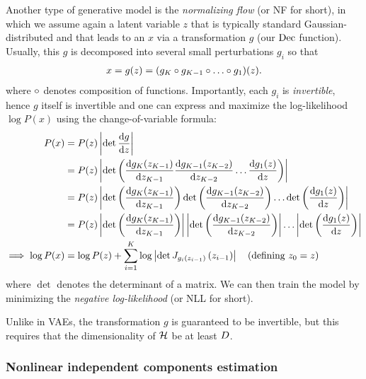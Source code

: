 \documentclass[../main.tex]{subfiles}
\begin{document}
Another type of generative model is the \emph{normalizing flow} (or NF for short), in which we assume again a latent variable $z$ that is typically standard Gaussian-distributed and that leads to an $x$ via a transformation $g$ (our $\operatorname{Dec}$ function).
Usually, this $g$ is decomposed into several small perturbations $g_i$ so that
\begin{align*}
x = g(z) = (g_K \circ g_{K-1} \circ \ldots \circ g_1) (z).
\end{align*}
where $\circ$ denotes composition of functions.
Importantly, each $g_i$ is \emph{invertible}, hence $g$ itself is invertible and one can express and maximize the log-likelihood $\log P(x)$ using the change-of-variable formula:
%
\begin{align*}
    P(x)               & = P(z) \left\lvert \det \frac{\mathrm{d} g}{\mathrm{d} z} \right\rvert       \\
                       & = P(z) \left\lvert \det \left(
        \frac{\mathrm{d} g_K(z_{K-1})}{\mathrm{d} z_{K-1}}
        \frac{\mathrm{d} g_{K-1}(z_{K-2})}{\mathrm{d} z_{K-2}}
        \ldots
        \frac{\mathrm{d} g_1(z)}{\mathrm{d} z}
    \right)\right\rvert                                                   \\
                       & = P(z) \left\lvert
        \det \left(
        \frac{\mathrm{d} g_K(z_{K-1})}{\mathrm{d} z_{K-1}}
        \right)
        \det \left(
        \frac{\mathrm{d} g_{K-1}(z_{K-2})}{\mathrm{d} z_{K-2}}
        \right)
        \ldots
        \det \left(
        \frac{\mathrm{d} g_1(z)}{\mathrm{d} z}
        \right)
    \right\rvert                                                          \\
                       & = P(z) \left\lvert
        \det \left(
        \frac{\mathrm{d} g_K(z_{K-1})}{\mathrm{d} z_{K-1}}
        \right)
    \right\rvert
    \left\lvert
        \det \left(
        \frac{\mathrm{d} g_{K-1}(z_{K-2})}{\mathrm{d} z_{K-2}}
        \right)
    \right\rvert
    \ldots
    \left\lvert
        \det \left(
        \frac{\mathrm{d} g_1(z)}{\mathrm{d} z}
        \right)
    \right\rvert                                                          \\
    \implies \log P(x) & = \log P(z) + \sum_{i=1}^K \log \left\lvert
        \det J_{g_i(z_{i-1})} \left( z_{i-1} \right)
    \right\rvert\quad \text{(defining $z_0 = z$)}
\end{align*}
where $\det$ denotes the determinant of a matrix.
We can then train the model by minimizing the \emph{negative log-likelihood} (or NLL for short).

Unlike in VAEs, the transformation $g$ is guaranteed to be invertible, but this requires that the dimensionality of $\mathcal{H}$ be at least $D$.

\subsubsection{Nonlinear independent components estimation}
\end{document}
